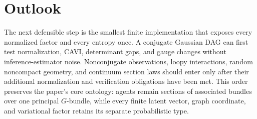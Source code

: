 \section{Outlook}

The next defensible step is the smallest finite implementation that exposes every normalized factor and every entropy once. A conjugate Gaussian DAG can first test normalization, CAVI, determinant gaps, and gauge changes without inference-estimator noise. Nonconjugate observations, loopy interactions, random noncompact geometry, and continuum section laws should enter only after their additional normalization and verification obligations have been met. This order preserves the paper's core ontology: agents remain sections of associated bundles over one principal \(G\)-bundle, while every finite latent vector, graph coordinate, and variational factor retains its separate probabilistic type.
